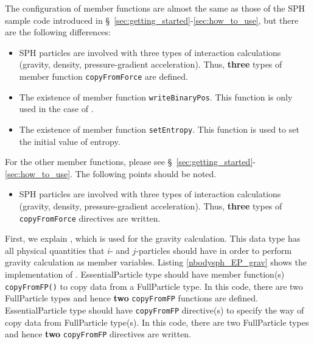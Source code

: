 \ifCpp %
The configuration of member functions are almost the same as those of the SPH sample code introduced in \S~\ref{sec:getting_started}-\ref{sec:how_to_use}, but there are the following differences:
\begin{itemize}[leftmargin=*,itemsep=-1ex]
\item SPH particles are involved with three types of interaction calculations (gravity, density, pressure-gradient acceleration). Thus, \textbf{three} types of member function \texttt{copyFromForce} are defined.
\item The existence of member function \texttt{writeBinaryPos}. This function is only used in the case of .
\item The existence of member function \texttt{setEntropy}. This function is used to set the initial value of entropy.
\end{itemize}
For the other member functions, please see \S~\ref{sec:getting_started}-\ref{sec:how_to_use}.
\endifCpp 
\ifIF %
The following points should be noted.
\begin{itemize}[leftmargin=*,itemsep=-1ex]
\item SPH particles are involved with three types of interaction calculations (gravity, density, pressure-gradient acceleration). Thus, \textbf{three} types of \texttt{copyFromForce} directives are written.
\end{itemize}
\endifIF

\ifCpp %

\endifCpp
\ifFtn %

\endifFtn
\ifC %

\endifC

First, we explain , which is used for the gravity calculation. This data type has all physical quantities that $i$- and $j$-particles should have in order to perform gravity calculation as member variables. Listing \ref{nbodysph_EP_grav} shows the implementation of . 
\ifCpp %
\textsf{EssentialParticle} type should have member function(s) \texttt{copyFromFP()} to copy data from a \textsf{FullParticle} type. In this code, there are two \textsf{FullParticle} types and hence \textbf{two} \texttt{copyFromFP} functions are defined.
\endifCpp
\ifIF %
\textsf{EssentialParticle} type should have \texttt{copyFromFP} directive(s) to specify the way of copy data from \textsf{FullParticle} type(s). In this code, there are two \textsf{FullParticle} types and hence \textbf{two} \texttt{copyFromFP} directives are written.
\endifIF

